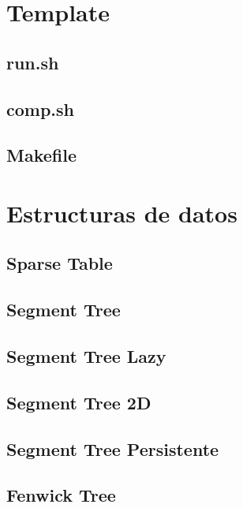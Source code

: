 \documentclass[a4paper,10pt,landscape,twocolumn]{article}
\begin{document}
\tableofcontents
\newpage
\section{Template} %

\subsection{run.sh}

\subsection{comp.sh}

\subsection{Makefile}


\section{Estructuras de datos} %
\subsection{Sparse Table}

\subsection{Segment Tree}

\subsection{Segment Tree Lazy}

\subsection{Segment Tree 2D}

\subsection{Segment Tree Persistente}

\subsection{Fenwick Tree}

\end{document}
